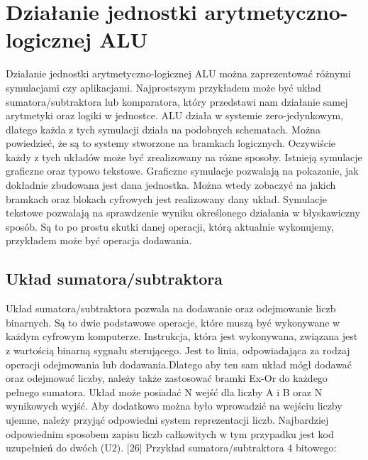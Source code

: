 \documentclass[12pt, a4paper, onside, polish]{article}				%
\begin{document}
\cleardoublepage





\section{Działanie jednostki arytmetyczno-logicznej ALU}
\hspace{\parindent}
Działanie jednostki arytmetyczno-logicznej ALU można zaprezentować różnymi symulacjami czy aplikacjami. Najprostszym przykładem może być układ sumatora/subtraktora lub komparatora, który przedstawi nam działanie samej arytmetyki oraz logiki w jednostce. ALU działa w systemie zero-jedynkowym, dlatego każda z tych symulacji działa na podobnych schematach. Można powiedzieć, że są to systemy stworzone na bramkach logicznych. Oczywiście każdy z tych układów może być zrealizowany na różne sposoby. Istnieją symulacje graficzne oraz typowo tekstowe. 
	 Graficzne symulacje pozwalają na pokazanie, jak dokładnie zbudowana jest dana jednostka. Można wtedy zobaczyć na jakich bramkach oraz blokach cyfrowych jest realizowany dany układ.  
	Symulacje tekstowe pozwalają na sprawdzenie wyniku określonego działania w błyskawiczny sposób. Są to po prostu skutki danej operacji, którą aktualnie wykonujemy, przykładem może być operacja dodawania.  
	

\subsection{Układ sumatora/subtraktora}
\hspace{\parindent}
Układ sumatora/subtraktora pozwala na dodawanie oraz odejmowanie liczb binarnych. Są to dwie podstawowe operacje, które muszą być wykonywane w każdym cyfrowym komputerze. Instrukcja, która jest wykonywana, związana jest z wartością binarną sygnału sterującego. Jest to linia, odpowiadająca za rodzaj operacji odejmowania lub dodawania.Dlatego aby ten sam układ mógł dodawać oraz odejmować liczby, należy także zastosować bramki Ex-Or do każdego pełnego sumatora. Układ może posiadać N wejść dla liczby A i B oraz N wynikowych wyjść. Aby dodatkowo można było wprowadzić na wejściu liczby ujemne, należy przyjąć odpowiedni system reprezentacji liczb. Najbardziej odpowiednim sposobem zapisu liczb całkowitych w tym przypadku jest kod uzupełnień do dwóch (U2). [26]
\cleardoublepage
Przykład sumatora/subtraktora 4 bitowego:
\end{document}
